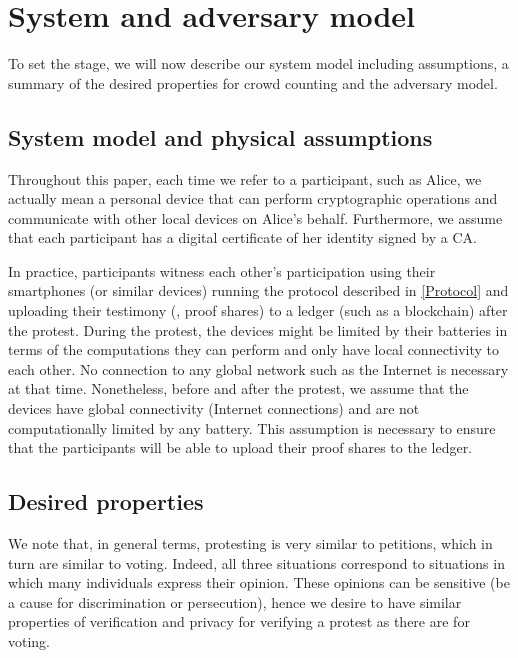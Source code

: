 \section{System and adversary model}%
\label{system-model}

To set the stage, we will now describe our system model including assumptions, a summary of the desired properties for crowd counting and the adversary model.

\subsection{System model and physical assumptions}%
\label{assumptions}

Throughout this paper, each time we refer to a participant, such as Alice, we actually mean a personal device that can perform cryptographic operations and communicate with other local devices on Alice's behalf. 
Furthermore, we assume that each participant has a digital certificate of her identity signed by a \ac{CA}.

In practice, participants witness each other's participation using their smartphones (or similar devices) running the protocol described in \cref{Protocol} and uploading their testimony (\ie, proof shares) to a ledger (such as a blockchain) after the protest. 
During the protest, the devices might be limited by their batteries in terms of the computations they can perform and only have local connectivity to each other.
No connection to any global network such as the Internet is necessary at that time.  
Nonetheless, before and after the protest, we assume that the devices have global connectivity (\ie Internet connections) and are not computationally limited by any battery.
This assumption is necessary to ensure that the participants will be able to upload their proof shares to the ledger.

\subsection{Desired properties}

We note that, in general terms, protesting is very similar to petitions, which 
in turn are similar to voting.
Indeed, all three situations correspond to situations in which many individuals express their opinion.
These opinions can be sensitive (\eg be a cause for discrimination or persecution), hence we desire to have similar properties of verification and privacy for verifying a protest as there are for voting.

